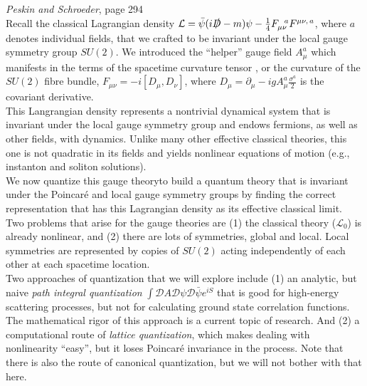 \noindent \textit{Peskin and Schroeder}, page 294 \\

\noindent Recall the classical Lagrangian density $\mathcal{L} = \bar{\psi}(i \slashed{D} - m) \psi - \frac{1}{4} F_{\mu\nu}^{\,\,\,\,a} F^{\mu\nu, \, a}$, where $a$ denotes individual fields, that we crafted to be invariant under the local gauge symmetry group $SU(2)$. We introduced the ``helper'' gauge field $A_{\mu}^a$ which manifests in the terms of the spacetime curvature tensor , or the curvature of the $SU(2)$ fibre bundle, $F_{\mu\nu} = -i [D_\mu, D_\nu]$, where $D_\mu = \partial_\mu - i g A_\mu^a \frac{\sigma^a}{2}$ is the covariant derivative. \\

\noindent This Langrangian density represents a nontrivial dynamical system that is invariant under the local gauge symmetry group and endows fermions, as well as other fields, with dynamics. Unlike many other effective classical theories, this one is not quadratic in its fields and yields nonlinear equations of motion (e.g., instanton and soliton solutions). \\

\noindent We now quantize this gauge theoryto build a quantum theory that is invariant under the Poincar\'e and local gauge symmetry groups by finding the correct representation that has this Lagrangian density as its effective classical limit. \\

\noindent Two problems that arise for the gauge theories are (1) the classical theory ($\mathcal{L}_0$) is already nonlinear, and (2) there are lots of symmetries, global and local. Local symmetries are represented by copies of $SU(2)$ acting independently of each other at each spacetime location. \\

\noindent Two approaches of quantization that we will explore include (1) an analytic, but naive \textit{path integral quantization} $\int \mathcal{D} A \mathcal{D} \psi \mathcal{D} \bar{\psi} e^{i S}$ that is good for high-energy scattering processes, but not for calculating ground state correlation functions. The mathematical rigor of this approach is a current topic of research. And (2) a computational route of \textit{lattice quantization}, which makes dealing with nonlinearity ``easy'', but it loses Poincar\'e invariance in the process. Note that there is also the route of canonical quantization, but we will not bother with that here.

